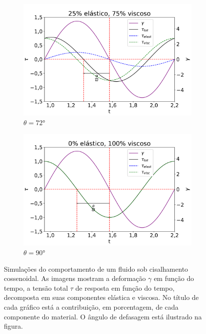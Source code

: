 \begin{figure}[H]
				\begin{subfigure}[t]{0.3\textwidth}
					\centering
					\includegraphics[width=\textwidth]{./imagens/reologia/Simulacao_visc_75}
					\caption{\(\theta=72°\)}
					\label{fig:osc_sim75}
				\end{subfigure}%
				\begin{subfigure}[t]{0.3\textwidth}
					\centering
					\includegraphics[width=\textwidth]{./imagens/reologia/Simulacao_visc_100}
					\caption{\(\theta=90°\)}
					\label{fig:osc_sim100}
				\end{subfigure}%
			\caption{Simulações do comportamento de um fluido sob cisalhamento cossenoidal. As imagens mostram a deformação \(\gamma\) em função do tempo, a tensão total \(\tau\) de resposta em função do tempo, decomposta em suas componentes elástica e viscosa. No título de cada gráfico está a contribuição, em porcentagem, de cada componente do material. O ângulo de defasagem está ilustrado na figura.}
			\label{fig:osc_simulacoes}
			\end{figure}  %
			
